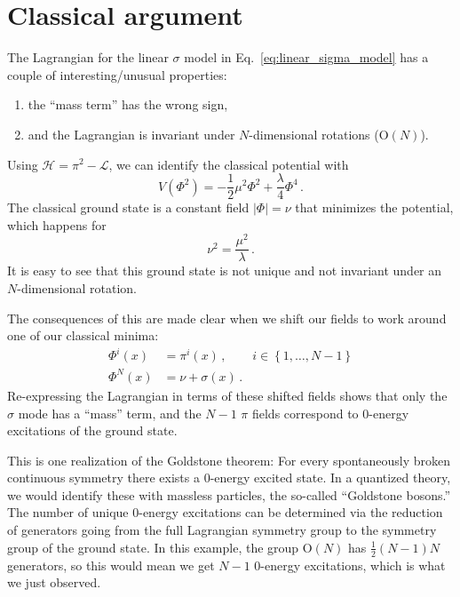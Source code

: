 \documentclass[12pt]{memoir}
\begin{document}
\section{Classical argument}

The Lagrangian for the linear $\sigma$ model in Eq.~\ref{eq:linear_sigma_model} has a couple of interesting/unusual properties:
\begin{enumerate}
  \item the ``mass term'' has the wrong sign,
  \item and the Lagrangian is invariant under $N$-dimensional rotations ($\text{O}(N)$).
\end{enumerate}
Using $\mathcal{H} = \pi^2 - \mathcal{L}$, we can identify the classical potential with
\begin{equation}
  V(\Phi^2) = - \frac{1}{2} \mu^2 \Phi^2 + \frac{\lambda}{4} \Phi^4\,.
\end{equation}
The classical ground state is a constant field $\lvert\Phi\rvert = \nu$ that minimizes the potential,
which happens for
\begin{equation}
  \nu^2 = \frac{\mu^2}{\lambda}\,.
\end{equation}
It is easy to see that this ground state is not unique and not invariant under an $N$-dimensional rotation.

The consequences of this are made clear when we shift our fields to work around one of our classical minima:
\begin{align}
  \Phi^i(x) & = \pi^i(x)\,,  &i \in \left\{1,\ldots,N-1\right\}\\
  \Phi^N(x) &=  \nu + \sigma(x)\,. &
\end{align}
Re-expressing the Lagrangian in terms of these shifted fields shows that only the $\sigma$ mode has a ``mass'' term,
and the $N-1$ $\pi$ fields correspond to 0-energy excitations of the ground state.

This is one realization of the Goldstone theorem:
For every spontaneously broken continuous symmetry there exists a 0-energy excited state.
In a quantized theory, we would identify these with massless particles, the so-called ``Goldstone bosons.''
The number of unique 0-energy excitations can be determined via the reduction of generators
going from the full Lagrangian symmetry group to the symmetry group of the ground state.
In this example, the group $\text{O}(N)$ has $\frac{1}{2}(N-1)N$ generators,
so this would mean we get $N-1$ 0-energy excitations, which is what we just observed.
\end{document}
